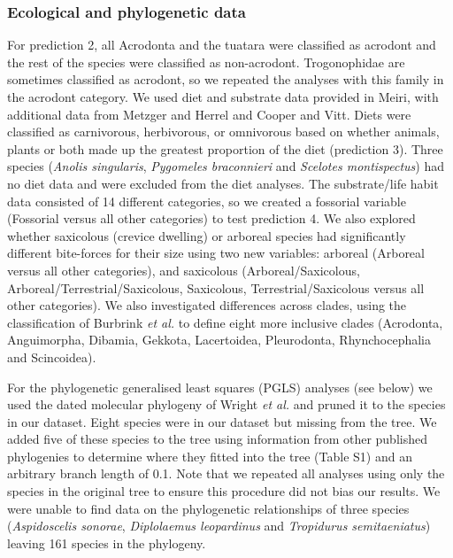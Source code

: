 \documentclass[a4paper, 12pt]{article}
\begin{document}
\subsubsection{Ecological and phylogenetic data}

For prediction 2, all Acrodonta and the tuatara were classified as acrodont and the rest of the species were classified as non-acrodont.
Trogonophidae are sometimes classified as acrodont\cite{jenkins2020bite}, so we repeated the analyses with this family in the acrodont category.
We used diet and substrate data provided in Meiri\cite{meiri2018traits}, with additional data from Metzger and Herrel\cite{metzger2005correlations} and Cooper and Vitt\cite{cooper2002distribution}. 
Diets were classified as carnivorous, herbivorous, or omnivorous based on whether animals, plants or both made up the greatest proportion of the diet (prediction 3\cite{meiri2018traits}).
Three species (\textit{Anolis singularis}, \textit{Pygomeles braconnieri} and \textit{Scelotes montispectus}) had no diet data and were excluded from the diet analyses. 
The substrate/life habit data\cite{meiri2018traits} consisted of 14 different categories, so we created a fossorial variable (Fossorial versus all other categories) to test prediction 4.  
We also explored whether saxicolous (crevice dwelling) or arboreal species had significantly different bite-forces for their size using two new variables: arboreal (Arboreal versus all other categories), and saxicolous (Arboreal/Saxicolous, Arboreal/Terrestrial/Saxicolous, Saxicolous, Terrestrial/Saxicolous versus all other categories). 
We also investigated differences across clades, using the classification of Burbrink \textit{et al.}\cite{burbrink2020interrogating} to define eight more inclusive clades (Acrodonta, Anguimorpha, Dibamia, Gekkota, Lacertoidea, Pleurodonta, Rhynchocephalia and Scincoidea). 

For the phylogenetic generalised least squares (PGLS) analyses (see below) we used the dated molecular phylogeny of Wright \textit{et al.}\cite{wright2015came} and pruned it to the species in our dataset. 
Eight species were in our dataset but missing from the tree. We added five of these species to the tree using information from other published phylogenies to determine where they fitted into the tree (Table S1) and an arbitrary branch length of 0.1. 
Note that we repeated all analyses using only the species in the original tree to ensure this procedure did not bias our results. We were unable to find data on the phylogenetic relationships of three species (\textit{Aspidoscelis sonorae}, \textit{Diplolaemus leopardinus} and \textit{Tropidurus semitaeniatus}) leaving 161 species in the phylogeny.
\end{document}
